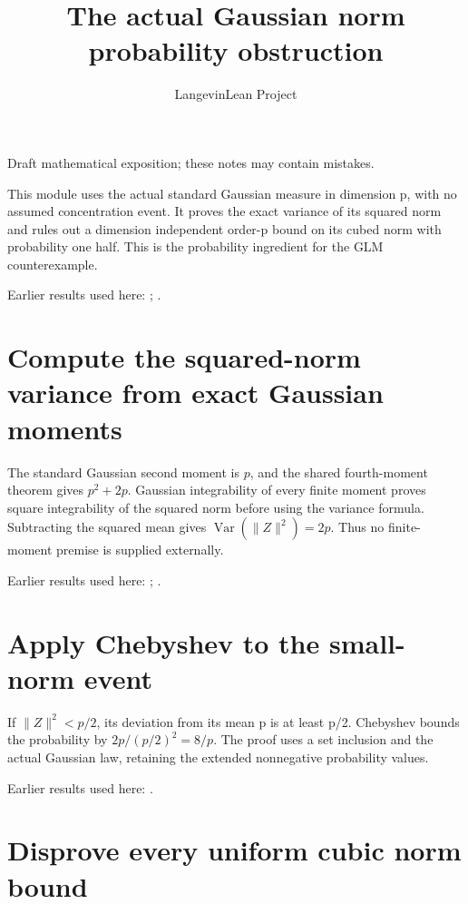 \documentclass[11pt,a4paper]{article}
\title{\texorpdfstring{The actual Gaussian norm probability obstruction}{The actual Gaussian norm probability obstruction}}
\author{LangevinLean Project}
\date{}
\begin{document}
\maketitle
Draft mathematical exposition; these notes may contain mistakes.


This module uses the actual standard Gaussian measure in dimension p, with no assumed concentration event. It proves the exact variance of its squared norm and rules out a dimension independent order-p bound on its cubed norm with probability one half. This is the probability ingredient for the GLM counterexample.



Earlier results used here: \cite[Section~3.68]{LangevinLean2026Kinetic}; \cite[Section~3.10]{LangevinLean2026ULALSI}.

\section{\texorpdfstring{Compute the squared-\allowbreak{}norm variance from exact Gaussian moments}{Compute the squared-norm variance from exact Gaussian moments}}


The standard Gaussian second moment is \(p\), and the shared fourth-moment theorem gives \(p^2+2p\). Gaussian integrability of every finite moment proves square integrability of the squared norm before using the variance formula. Subtracting the squared mean gives \(\operatorname{Var}(\|Z\|^2)=2p\). Thus no finite-moment premise is supplied externally.



Earlier results used here: \cite[Section~3.10.1]{LangevinLean2026ULALSI}; \cite[Section~3.68.2]{LangevinLean2026Kinetic}.

\section{\texorpdfstring{Apply Chebyshev to the small-\allowbreak{}norm event}{Apply Chebyshev to the small-norm event}}


If \(\|Z\|^2<p/2\), its deviation from its mean p is at least p/\allowbreak{}2. Chebyshev bounds the probability by \(2p/(p/2)^2=8/p\). The proof uses a set inclusion and the actual Gaussian law, retaining the extended nonnegative probability values.



Earlier results used here: \cite[Section~3.10.1]{LangevinLean2026ULALSI}.

\section{\texorpdfstring{Disprove every uniform cubic norm bound}{Disprove every uniform cubic norm bound}}
\end{document}
